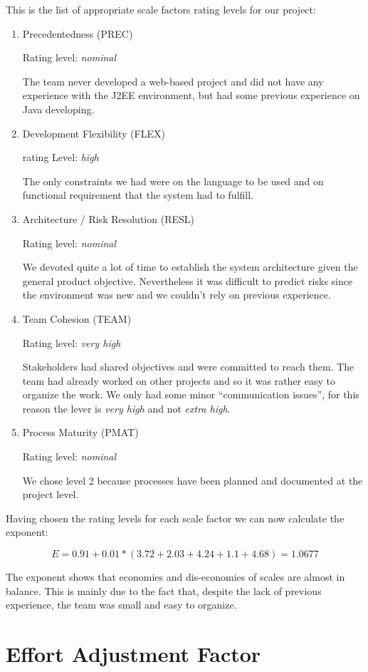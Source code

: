 \documentclass[10pt,a4paper,titlepage]{article}
\begin{document}
\vspace{10pt}
This is the list of appropriate scale factors rating levels for our project:
\begin{enumerate}
\item Precedentedness (PREC)

Rating level: \textit{nominal}

The team never developed a web-based project and did not have any experience with the J2EE environment, but had some previous experience on Java developing.

\item Development Flexibility (FLEX)

rating Level: \textit{high}

The only constraints we had were on the language to be used and on functional requirement that the system had to fulfill. 

\item Architecture / Risk Resolution (RESL)

Rating level: \textit{nominal}

We devoted quite a lot of time to establish the system architecture given the general product objective. Nevertheless it was difficult to predict risks since the environment was new and we couldn't rely on previous experience.

\item Team Cohesion (TEAM)

Rating level: \textit{very high}

Stakeholders had shared objectives and were committed to reach them. The team had already worked on other projects and so it was rather easy to organize the work. We only had some minor ``communication issues'', for this reason the lever is \textit{very high} and not \textit{extra high}.

\item Process Maturity (PMAT)

Rating level: \textit{nominal}

We chose level 2 because processes have been planned and documented at the project level.
\end{enumerate}

Having chosen the rating levels for each scale factor we can now calculate the exponent:

\[E=0.91+0.01*(3.72+2.03+4.24+1.1+4.68)=1.0677\]

The exponent shows that economies and dis-economies of scales are almost in balance. This is mainly due to the fact that, despite the lack of previous experience, the team was small and easy to organize.

\section{Effort Adjustment Factor}
\end{document}
